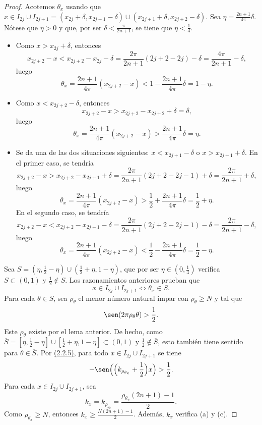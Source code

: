 \documentclass[a4paper, 12pt, oneside]{book}
\begin{document}
\begin{proof}
    Acotemos $\theta_x$ usando que $x \in I_{2j}\cup I_{2j+1}= (x_{2j}+\delta,x_{2j+1}-\delta) \cup (x_{2j+1}+\delta,x_{2j+2}-\delta)$. Sea $\eta = \frac{2n+1}{4\pi}\delta$. Nótese que $\eta > 0$ y que, por ser $\delta < \frac{\pi}{2n+1}$, se tiene que $\eta < \frac{1}{4}$.
    \begin{itemize}
        \item Como $x > x_{2j}+\delta$, entonces
        \[x_{2j+2}-x < x_{2j+2}-x_{2j}-\delta = \frac{2\pi}{2n+1}(2j+2-2j)-\delta = \frac{4\pi}{2n+1}-\delta,\]
        luego 
        \[\theta_x = \frac{2n+1}{4\pi}(x_{2j+2}-x) < 1-\frac{2n+1}{4\pi}\delta = 1-\eta.\]
        \item Como $x < x_{2j+2}-\delta$, entonces
        \[x_{2j+2}-x > x_{2j+2}-x_{2j+2}+\delta = \delta,\]
        luego
        \[\theta_x = \frac{2n+1}{4\pi}(x_{2j+2}-x) > \frac{2n+1}{4\pi}\delta = \eta.\]
        \item Se da una de las dos situaciones siguientes: $x < x_{2j+1}-\delta$ o $x > x_{2j+1}+\delta$. En el primer caso, se tendría
        \[x_{2j+2}-x > x_{2j+2}-x_{2j+1}+\delta = \frac{2\pi}{2n+1}(2j+2-2j-1)+\delta = \frac{2\pi}{2n+1}+\delta,\]
        luego
        \[\theta_x = \frac{2n+1}{4\pi}(x_{2j+2}-x) > \frac{1}{2}+\frac{2n+1}{4\pi}\delta = \frac{1}{2}+\eta.\]
        En el segundo caso, se tendría
        \[x_{2j+2}-x < x_{2j+2}-x_{2j+1}-\delta = \frac{2\pi}{2n+1}(2j+2-2j-1)-\delta = \frac{2\pi}{2n+1}- \delta,\]
        luego
        \[\theta_x = \frac{2n+1}{4\pi}(x_{2j+2}-x) < \frac{1}{2}-\frac{2n+1}{4\pi}\delta = \frac{1}{2}-\eta.\]
    \end{itemize}

    Sea $S = (\eta,\frac{1}{2}-\eta) \cup (\frac{1}{2}+\eta,1-\eta)$, que por ser $\eta \in (0,\frac{1}{4})$ verifica $S \subset (0,1)$ y $\frac{1}{2}\not\in S$. Los razonamientos anteriores prueban que
    \[x \in I_{2j} \cup I_{2j+1} \iff \theta_x \in S.\]
    Para cada $\theta \in S$, sea $\rho_\theta$ el menor número natural impar con $\rho_\theta \geq N$ y tal que
    \[\sen(2\pi\rho_\theta\theta) > \frac{1}{2}.\]
    Este $\rho_\theta$ existe por el lema anterior. De hecho, como $\overline{S} = [\eta,\frac{1}{2}-\eta] \cup [\frac{1}{2}+\eta,1-\eta] \subset (0,1)$ y $\frac{1}{2}\not\in\overline{S}$, esto también tiene sentido para $\theta \in \overline{S}$. Por \hyperref[2.2.5]{\color{blue}(2.2.5)}, para todo $x \in I_{2j} \cup I_{2j+1}$ se tiene
    \[-\sen\Bigl(\Bigl(k_{\rho_{\theta_x}}+\frac{1}{2}\Bigr)x\Bigr) > \frac{1}{2}.\]
    Para cada $x \in I_{2j} \cup I_{2j+1}$, sea
    \[k_x = k_{\rho_{\theta_x}} = \frac{\rho_{\theta_x}(2n+1)-1}{2}.\] Como $\rho_{\theta_x} \geq N$, entonces $k_x \geq \frac{N(2n+1)-1}{2}$. Además, $k_x$ verifica (a) y (c). 


\end{proof}
\end{document}
